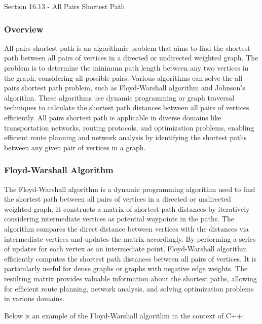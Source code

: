 \begin{notes}{Section 16.13 - All Pairs Shortest Path}
    \subsubsection*{Overview}

    All pairs shortest path is an algorithmic problem that aims to find the shortest path between all pairs of vertices in a directed or undirected weighted graph. The problem is to determine the minimum path length between any two 
    vertices in the graph, considering all possible pairs. Various algorithms can solve the all pairs shortest path problem, such as Floyd-Warshall algorithm and Johnson's algorithm. These algorithms use dynamic programming or graph 
    traversal techniques to calculate the shortest path distances between all pairs of vertices efficiently. All pairs shortest path is applicable in diverse domains like transportation networks, routing protocols, and optimization 
    problems, enabling efficient route planning and network analysis by identifying the shortest paths between any given pair of vertices in a graph.
    
    \subsubsection*{Floyd-Warshall Algorithm}
    
    The Floyd-Warshall algorithm is a dynamic programming algorithm used to find the shortest path between all pairs of vertices in a directed or undirected weighted graph. It constructs a matrix of shortest path distances by iteratively 
    considering intermediate vertices as potential waypoints in the paths. The algorithm compares the direct distance between vertices with the distances via intermediate vertices and updates the matrix accordingly. By performing a series 
    of updates for each vertex as an intermediate point, Floyd-Warshall algorithm efficiently computes the shortest path distances between all pairs of vertices. It is particularly useful for dense graphs or graphs with negative edge weights. 
    The resulting matrix provides valuable information about the shortest paths, allowing for efficient route planning, network analysis, and solving optimization problems in various domains.
    
    \begin{highlight}
        Below is an example of the Floyd-Warshall algorithm in the context of C++:
    

\end{highlight}
\end{notes}
